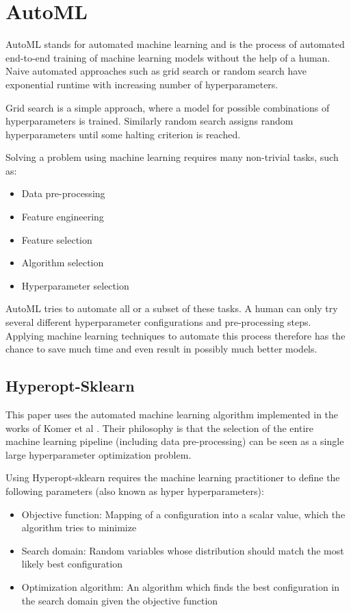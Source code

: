 \documentclass[draft,final,oneside]{vutinfth} %
\begin{document}
\section{AutoML} \label{automlbackground}

AutoML stands for automated machine learning and is the process of automated end-to-end training of machine learning models without the help of a human. Naive automated approaches such as grid search or random search have exponential runtime with increasing number of hyperparameters.

Grid search is a simple approach, where a model for possible combinations of hyperparameters is trained. Similarly random search assigns random hyperparameters until some halting criterion is reached.

Solving a problem using machine learning requires many non-trivial tasks, such as:

\begin{itemize}
\item Data pre-processing
\item Feature engineering
\item Feature selection
\item Algorithm selection
\item Hyperparameter selection
\end{itemize}

AutoML tries to automate all or a subset of these tasks. A human can only try several different hyperparameter configurations and pre-processing steps. Applying machine learning techniques to automate this process therefore has the chance to save much time and even result in possibly much better models.

\subsection{Hyperopt-Sklearn \cite{hyperoptpaper}}

This paper uses the automated machine learning algorithm implemented in the works of Komer et al \cite{hyperoptpaper}. Their philosophy is that the selection of the entire machine learning pipeline (including data pre-processing) can be seen as a single large hyperparameter optimization problem.

Using Hyperopt-sklearn requires the machine learning practitioner to define the following parameters (also known as hyper hyperparameters):
\begin{itemize}
\item Objective function: Mapping of a configuration into a scalar value, which the algorithm tries to minimize
\item Search domain: Random variables whose distribution should match the most likely best configuration 
\item Optimization algorithm: An algorithm which finds the best configuration in the search domain given the objective function
\end{itemize}
\end{document}
